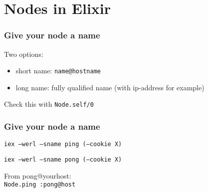 \section{Nodes in Elixir}
\frame{\tableofcontents[currentsection]}

\begin{frame}
    \frametitle{Give your node a name}
    Two options:
    \begin{itemize}
        \item short name: \texttt{name@hostname}
        \item long name: fully qualified name (with ip-address for example)
    \end{itemize}
    
    \vfill

    Check this with \texttt{Node.self/0}
\end{frame}

\begin{frame}
    \frametitle{Give your node a name}
    
    \texttt{iex --werl --sname ping (--cookie X)}

    \texttt{iex --werl --sname pong (--cookie X)}

    \vfill

    From pong@yourhost: \\
    \texttt{Node.ping :pong@host}
\end{frame}